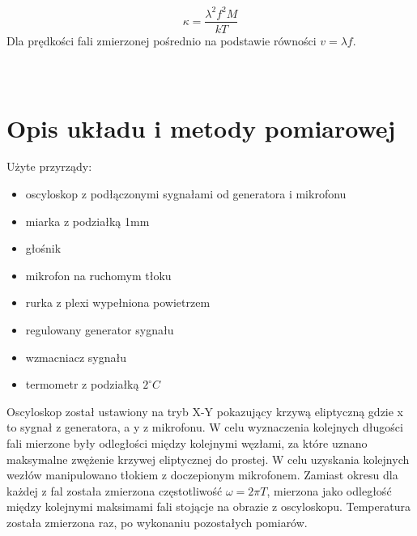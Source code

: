 \documentclass[a4paper,10pt]{article}
\begin{document}
\begin{equation}
  \kappa = \frac{\lambda^2 f^2 M}{kT}
\end{equation}
Dla prędkości fali zmierzonej pośrednio na podstawie równości $v = \lambda f$.
\\\\\\

\section{Opis układu i metody pomiarowej}
Użyte przyrządy:
\begin{itemize}
  \item oscyloskop z podłączonymi sygnałami od generatora i mikrofonu
  \item miarka z podziałką 1mm
  \item głośnik
  \item mikrofon na ruchomym tłoku
  \item rurka z plexi wypełniona powietrzem
  \item regulowany generator sygnału
	\item wzmacniacz sygnału
  \item termometr z podziałką $2^\circ C$
\end{itemize}
Oscyloskop został ustawiony na tryb X-Y pokazujący krzywą eliptyczną gdzie x to sygnał z generatora, a y z mikrofonu. W celu wyznaczenia kolejnych długości fali mierzone były
odległości między kolejnymi węzłami, za które uznano maksymalne zwężenie krzywej eliptycznej do prostej. W celu uzyskania kolejnych  wezłów manipulowano tłokiem z doczepionym mikrofonem.
Zamiast okresu dla każdej z fal została zmierzona częstotliwość $\omega = 2 \pi T$, mierzona jako odległość między kolejnymi maksimami fali stojącje na
obrazie z oscyloskopu. Temperatura została zmierzona raz, po wykonaniu pozostałych pomiarów.
\end{document}
